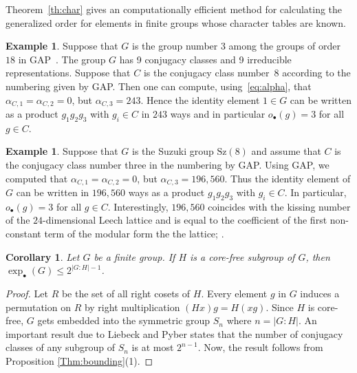 \documentclass[12pt,leqno]{amsart}
\newtheorem{cor}[theorem]{\sc Corollary}
\theoremstyle{definition}
\newtheorem{exe}[theorem]{\sc Example}
\newcommand{\go}[1]{o_{\bullet}(#1)}
\begin{document}
Theorem~\ref{th:char} gives an computationally efficient method for calculating the generalized order for elements in finite groups whose character tables are known.

\begin{exe}
    Suppose that $G$ is the group number $3$ among the groups of order $18$ in GAP~\cite{GAP4}. 
    The group $G$ has 9 conjugacy classes and 9 irreducible representations. Suppose that $C$ is 
    the conjugacy class number~8 according to the numbering given by GAP. Then one can 
    compute, using~\eqref{eq:alpha}, that $\alpha_{C,1}=\alpha_{C,2}=0$, but $\alpha_{C,3}=243$. 
    Hence the identity element $1\in G$ can be written as a product $g_1g_2g_3$ with $g_i\in C$ in $243$ ways and in particular 
    $\go g=3$ for all $g\in C$. 
\end{exe}

\begin{exe} \label{exe:Suzuki}
    Suppose that $G$ is the Suzuki group $\mbox{Sz}(8)$ and assume that $C$ is the 
    conjugacy class number three in the numbering by GAP. 
    Using GAP, we computed that $\alpha_{C,1}=\alpha_{C,2}=0$, but $\alpha_{C,3}=196,560$. 
    Thus the identity element of $G$ can be written in $196,560$ ways as a product $g_1g_2g_3$ with 
    $g_i\in C$. In particular, $\go g=3$ for all $g\in C$. 
    Interestingly, $196,560$ coincides with the kissing number of the $24$-dimensional 
Leech lattice and is equal to the coefficient of the first non-constant  term of the modular form the the lattice; \cite[Section~2]{CS}.
\end{exe}


\begin{cor}
Let $G$ be a finite group. If $H$ is a core-free  subgroup of $G$, then $\exp_{\bullet}(G)\leq 2^{|G:H|-1}$.
\end{cor}

\begin{proof}
Let $R$ be the set of all right cosets of $H$. Every element $g$ in $G$ induces a permutation on $R$ by right multiplication $(Hx)g=H(xg)$. Since $H$ is core-free, 
$G$ gets embedded into the symmetric group $S_n$ where $n=|G:H|$. 
 An important result due to Liebeck and Pyber \cite[Theorem 2]{LP} states that the number of conjugacy classes of any subgroup of $S_n$ is at most $2^{n-1}$. Now, the result follows from Proposition \ref{Thm:bounding}(1).
\end{proof}
\end{document}
